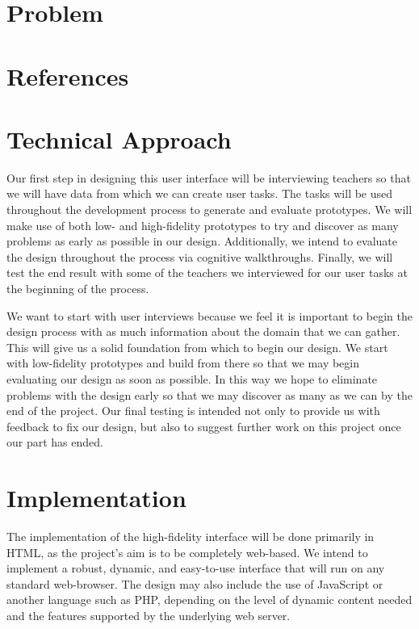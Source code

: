 \documentclass[11pt,letter]{article}
\begin{document}
\section{Problem}

\section{References}

\section{Technical Approach}
Our first step in designing this user interface will be interviewing teachers so
that we will have data from which we can create user tasks. The tasks will be
used throughout the development process to generate and evaluate prototypes. We
will make use of both low- and high-fidelity prototypes to try and discover as
many problems as early as possible in our design. Additionally, we intend to
evaluate the design throughout the process via cognitive walkthroughs. Finally,
we will test the end result with some of the teachers we interviewed for our
user tasks at the beginning of the process.

We want to start with user interviews because we feel it is important to begin
the design process with as much information about the domain that we can gather.
This will give us a solid foundation from which to begin our design. We start
with low-fidelity prototypes and build from there so that we may begin
evaluating our design as soon as possible. In this way we hope to eliminate
problems with the design early so that we may discover as many as we can by the
end of the project. Our final testing is intended not only to provide us with
feedback to fix our design, but also to suggest further work on this project
once our part has ended.

\section{Implementation}
The implementation of the high-fidelity interface will be done primarily in
HTML, as the project's aim is to be completely web-based.  We intend to
implement a robust, dynamic, and easy-to-use interface that will run on any
standard web-browser.  The design may also include the use of JavaScript or
another language such as PHP, depending on the level of dynamic content needed
and the features supported by the underlying web server.
\end{document}
